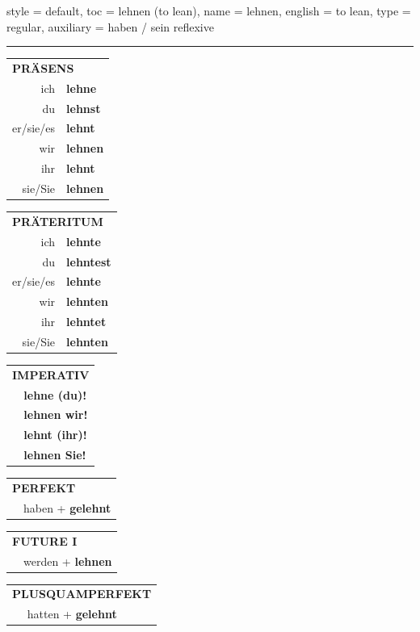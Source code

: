 \begin{verbentry}{
  style = {default},
  toc = {lehnen (to lean)},
  name = {lehnen},
  english = {to lean},
  type = {regular},
  auxiliary = {haben / sein reflexive}
}


\vspace{5pt}
\hrule
\vspace{5pt}

\begin{tabular}{rl}
\multicolumn{2}{l}{\textbf{PRÄSENS}}\\
ich & \textbf{lehne}\\
du & \textbf{lehnst}\\
er/sie/es & \textbf{lehnt}\\
wir & \textbf{lehnen}\\
ihr & \textbf{lehnt}\\
sie/Sie & \textbf{lehnen}\\
\end{tabular}
\hfill
\begin{tabular}{rl}
\multicolumn{2}{l}{\textbf{PRÄTERITUM}}\\
ich & \textbf{lehnte}\\
du & \textbf{lehntest}\\
er/sie/es & \textbf{lehnte}\\
wir & \textbf{lehnten}\\
ihr & \textbf{lehntet}\\
sie/Sie & \textbf{lehnten}\\
\end{tabular}
\hfill
\begin{tabular}{rl}
\multicolumn{2}{l}{\textbf{IMPERATIV}}\\
& \textbf{lehne (du)!}\\
& \textbf{lehnen wir!}\\
& \textbf{lehnt (ihr)!}\\
& \textbf{lehnen Sie!}\\
\end{tabular}

\vspace{10pt}

\begin{tabular}{rl}
\multicolumn{2}{l}{\textbf{PERFEKT}}\\
& haben + \textbf{gelehnt}\\
\end{tabular}
\hfill
\begin{tabular}{rl}
\multicolumn{2}{l}{\textbf{FUTURE I}}\\
& werden + \textbf{lehnen}\\
\end{tabular}
\hfill
\begin{tabular}{rl}
\multicolumn{2}{l}{\textbf{PLUSQUAMPERFEKT}}\\
& hatten + \textbf{gelehnt}\\
\end{tabular}


\end{verbentry}
